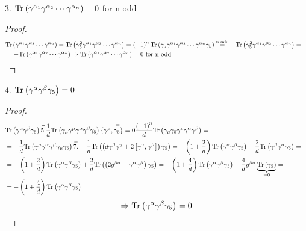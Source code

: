 3. $\mathrm{Tr} \left( \gamma^{\alpha_1}\gamma^{\alpha_2} \cdots \gamma^{\alpha_n} \right) = 0$ for n odd
\begin{proof}
\begin{align*}
& \mathrm{Tr} \left( \gamma^{\alpha_1}\gamma^{\alpha_2} \cdots \gamma^{\alpha_n} \right) = \mathrm{Tr} \left( \gamma_5^2 \gamma^{\alpha_1}\gamma^{\alpha_2} \cdots \gamma^{\alpha_n} \right) = \left( -1 \right)^n \mathrm{Tr} \left(\gamma_5 \gamma^{\alpha_1}\gamma^{\alpha_2} \cdots \gamma^{\alpha_n} \gamma_5 \right) \overset{\text{n odd}}{=} - \mathrm{Tr} \left( \gamma_5^2 \gamma^{\alpha_1}\gamma^{\alpha_2} \cdots \gamma^{\alpha_n} \right) = & \\
& = - \mathrm{Tr} \left( \gamma^{\alpha_1}\gamma^{\alpha_2} \cdots \gamma^{\alpha_n} \right)
\Rightarrow \mathrm{Tr} \left( \gamma^{\alpha_1}\gamma^{\alpha_2} \cdots \gamma^{\alpha_n} \right) = 0 \text{ for n odd} &
\end{align*}
\end{proof}

4. $\mathrm{Tr} \left( \gamma^{\alpha}\gamma^{\beta} \gamma_5 \right) = 0$
\begin{proof}
\begin{align*}
&\mathrm{Tr} \left( \gamma^{\alpha}\gamma^{\beta} \gamma_5 \right) \overset{=}{5.} \frac{1}{d}\mathrm{Tr} \left( \gamma_{\mu}\gamma^{\mu}\gamma^{\alpha}\gamma^{\beta} \gamma_5 \right) \overset{=}{\left\lbrace \gamma^{\mu},\gamma_5 \right\rbrace =0}  \frac{\left(-1\right)^3}{d} \mathrm{Tr} \left( \gamma_{\mu}\gamma_5\gamma^{\mu}\gamma^{\alpha}\gamma^{\beta} \right) = & \\
& = -\frac{1}{d} \mathrm{Tr} \left(\gamma^{\mu}\gamma^{\alpha}\gamma^{\beta}\gamma_{\mu}\gamma_5 \right) \overset{=}{7.} -\frac{1}{d} \mathrm{Tr} \left( \left( d\gamma^{\beta}\gamma^{\gamma} + 2 \left[ \gamma^{\gamma}, \gamma^{\beta} \right] \right) \gamma_5 \right) = - \left(1+\frac{2}{d}\right) \mathrm{Tr} \left( \gamma^{\alpha}\gamma^{\beta}\gamma_5 \right) + \frac{2}{d} \mathrm{Tr} \left( \gamma^{\beta}\gamma^{\alpha}\gamma_5 \right) =  & \\
& = - \left(1+\frac{2}{d}\right) \mathrm{Tr} \left( \gamma^{\alpha}\gamma^{\beta}\gamma_5 \right) + \frac{2}{d} \mathrm{Tr} \left( \left( 2g^{\beta\alpha} - \gamma^{\alpha}\gamma^{\beta} \right)\gamma_5 \right) = - \left(1+\frac{4}{d}\right) \mathrm{Tr} \left( \gamma^{\alpha}\gamma^{\beta}\gamma_5 \right) + \frac{4}{d} g^{\beta\alpha} \underbrace{\mathrm{Tr} \left(\gamma_5 \right)}_{=0} = & \\
& = - \left(1+\frac{4}{d} \right) \mathrm{Tr} \left( \gamma^{\alpha}\gamma^{\beta} \gamma_5 \right) &
\end{align*}
\begin{equation*}
\Rightarrow \mathrm{Tr} \left( \gamma^{\alpha}\gamma^{\beta} \gamma_5 \right) = 0
\end{equation*}
\end{proof}

